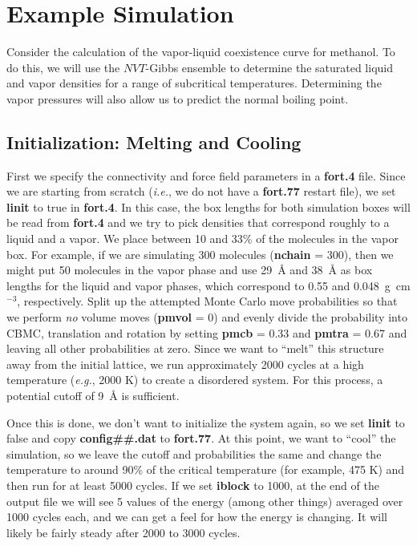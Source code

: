 \documentclass[12pt,letterpaper]{article}
\begin{document}
{{{{{{{%


\section{Example Simulation} 

\noindent Consider the calculation of the vapor-liquid coexistence curve
for methanol.  To do this, we will use the $NVT$-Gibbs ensemble to
determine the saturated liquid and vapor densities for a range of
subcritical temperatures.  Determining the vapor pressures will also
allow us to predict the normal boiling point.

\subsection{Initialization: Melting and Cooling}

\noindent First we specify the connectivity and force field parameters
in a {\bf fort.4} file.  Since we are starting from scratch ({\it i.e.}, we do not have
a {\bf fort.77} restart file), we set {\bf linit} to true in {\bf fort.4}.  
In this case, the box lengths for both simulation boxes
will be read from {\bf fort.4} and we try to pick densities that
correspond roughly to a liquid and a vapor.  We place between 10 and 33\%
of the molecules in the vapor box.  For example, if we are simulating 300 molecules
({\bf nchain} = 300), then we might put 50 molecules in the vapor phase and use 29~{\AA} 
and 38~{\AA} as box lengths for the liquid and vapor phases, which
correspond to 0.55 and 0.048~g~cm$^{-3}$, respectively.
%
\noindent Split up the attempted Monte Carlo move probabilities so that we
perform {\sl no} volume moves ({\bf pmvol} = 0) and evenly divide the
probability into CBMC, translation and rotation by setting {\bf pmcb}
= 0.33 and {\bf pmtra} = 0.67 and leaving all other probabilities at
zero.  Since we want to ``melt'' this structure away from the initial lattice,
we run approximately 2000 cycles at a high temperature ({\it e.g.}, 2000 K)
to create a disordered system.  For this process, a potential cutoff of 9~{\AA} is sufficient.  

\noindent Once this is done, we don't want to initialize the system again, so we set
{\bf linit} to false and copy {\bf config\#\#.dat} to {\bf fort.77}.  At
this point, we want to ``cool'' the simulation, so we leave the cutoff
and probabilities the same and change the temperature to around 90\%
of the critical temperature (for example, 475 K) and then run for at least
5000 cycles.  If we set {\bf iblock} to 1000, at the end of the
output file we will see 5 values of the energy (among other things)
averaged over 1000 cycles each, and we can get a feel for how the energy is
changing.  It will likely be fairly steady after 2000 to 3000 cycles.

}}}}}}}
\end{document}
